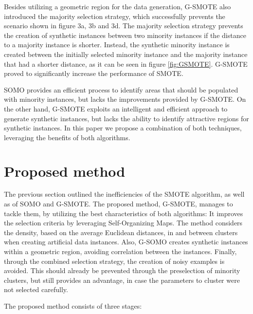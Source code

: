 \documentclass[parskip=full]{scrartcl}
\begin{document}
Besides utilizing a geometric region for the data generation, G-SMOTE also
introduced the majority selection strategy, which successfully prevents the
scenario shown in figure 3a, 3b and 3d. The majority selection strategy prevents
the creation of synthetic instances between two minority instances if the
distance to a majority instance is shorter. Instead, the synthetic minority
instance is created between the initially selected minority instance and the
majority instance that had a shorter distance, as it can be seen in figure \ref{fig:GSMOTE}.
G-SMOTE proved to significantly increase the performance of SMOTE. 

SOMO provides an efficient process to identify areas that should be populated
with minority instances, but lacks the improvements provided by G-SMOTE. On the
other hand, G-SMOTE exploits an intelligent and efficient approach to generate
synthetic instances, but lacks the ability to identify attractive regions for
synthetic instances. In this paper we propose a combination of both techniques,
leveraging the benefits of both algorithms. 

\section{Proposed method}

The previous section outlined the inefficiencies of the SMOTE algorithm, as well
as of SOMO and G-SMOTE. The proposed method, G-SMOTE, manages to tackle them, by
utilizing the best characteristics of both algorithms: It improves the selection
criteria by leveraging Self-Organizing Maps. The method considers the density,
based on the average Euclidean distances, in and between clusters when creating
artificial data instances. Also, G-SOMO creates synthetic instances within a
geometric region, avoiding correlation between the instances. Finally, through
the combined selection strategy, the creation of noisy examples is avoided. This
should already be prevented through the preselection of minority clusters, but
still provides an advantage, in case the parameters to cluster were not selected
carefully.

The proposed method consists of three stages:
\end{document}

